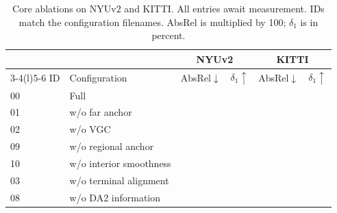 \begin{table}[!t]
	\centering
	\caption{Core ablations on NYUv2 and KITTI. All entries await measurement. IDs match the configuration filenames. AbsRel is multiplied by 100; $\delta_1$ is in percent.}
	\label{tab:sky_ablation}
	\setlength{\tabcolsep}{3pt}
	\footnotesize
	\begin{tabular}{@{}llrrrr@{}}
		\toprule
		   &                        & \multicolumn{2}{c}{NYUv2} & \multicolumn{2}{c}{KITTI}                                           \\
		\cmidrule(lr){3-4}\cmidrule(l){5-6}
		ID & Configuration          & AbsRel$\downarrow$        & $\delta_1\uparrow$        & AbsRel$\downarrow$ & $\delta_1\uparrow$ \\
		\midrule
		00 & Full                   & \pending                  & \pending                  & \pending           & \pending           \\
		01 & w/o far anchor         & \pending                  & \pending                  & \pending           & \pending           \\
		02 & w/o VGC                & \pending                  & \pending                  & \pending           & \pending           \\
		09 & w/o regional anchor    & \pending                  & \pending                  & \pending           & \pending           \\
		10 & w/o interior smoothness & \pending                 & \pending                  & \pending           & \pending           \\
		03 & w/o terminal alignment & \pending                  & \pending                  & \pending           & \pending           \\
		08 & w/o DA2 information    & \pending                  & \pending                  & \pending           & \pending           \\
		\bottomrule
	\end{tabular}
\end{table}
